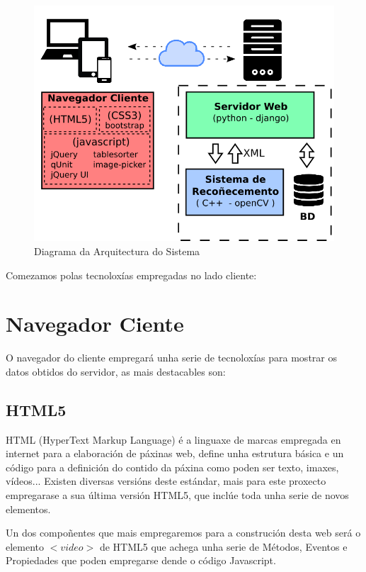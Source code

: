     \begin{figure}[htp]
    \begin{center}
        \includegraphics[scale=0.6]{figures/ArqSistemaCustom.png}
        \caption{Diagrama da Arquitectura do Sistema}
    \label{fig:ArqSistemaCustom}
    \end{center}
    \end{figure}
    
    Comezamos polas tecnoloxías empregadas no lado cliente:
    \section{Navegador Ciente}
    
    O navegador do cliente empregará unha serie de tecnoloxías para mostrar os datos obtidos do 
    servidor, as mais destacables son:
    
    \subsection{HTML5}
        HTML (HyperText Markup Language) é a linguaxe de marcas empregada en internet para a elaboración
        de páxinas web, define unha estrutura básica e un código para a definición do contido da páxina
        como poden ser texto, imaxes, vídeos... Existen diversas versións deste estándar, mais para este
        proxecto empregarase a sua última versión HTML5, que inclúe toda unha serie de novos elementos.
        
        Un dos compoñentes que mais empregaremos para a construción desta web será o elemento 
        $<video>$ de HTML5 que achega unha serie de Métodos, Eventos e Propiedades
        \cite{w3school-video-events} que poden empregarse dende o código Javascript.
        
